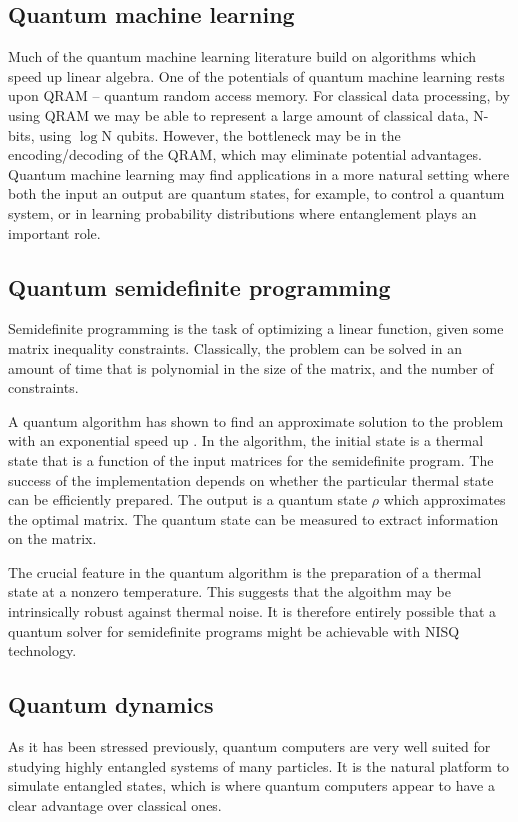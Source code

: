 \subsection{Quantum machine learning}
Much of the quantum machine learning literature build on algorithms which speed up linear algebra\cite{biamonte2017quantum}.
One of the potentials of quantum machine learning rests upon QRAM -- quantum random access memory. For classical data processing, by using QRAM we may be able to represent a large amount of classical data, N-bits, using $\log$N qubits. However, the bottleneck may be in the encoding/decoding of the QRAM, which may eliminate potential advantages. 
Quantum machine learning may find applications in a more natural setting where both the input an output are quantum states, for example, to control a quantum system, or in learning probability distributions where entanglement plays an important role.

\subsection{Quantum semidefinite programming}

Semidefinite programming is the task of optimizing a linear function, given some matrix inequality constraints. Classically, the problem can be solved in an amount of time that 
is polynomial in the size of the matrix, and the number of constraints.

A quantum algorithm has shown to find an approximate solution to the problem with an exponential speed up \cite{brandao2017quantum,brandao2017exponential}. In the algorithm, the initial state is a thermal state that is a function of the input matrices for the semidefinite program. The success of the implementation depends on whether the particular thermal state can be efficiently prepared. 
The output is a quantum state $\rho$ which approximates the optimal matrix. The quantum state can be measured to extract information on the matrix. 


The crucial feature in the quantum algorithm is the preparation of a thermal state at a nonzero temperature. This suggests that the algoithm may be intrinsically robust against thermal noise. It is therefore entirely possible that a quantum solver for semidefinite programs might be achievable with NISQ technology.


\subsection{Quantum dynamics}
As it has been stressed previously, quantum computers are very well suited for studying highly entangled systems of many particles. It is the natural platform to simulate entangled states, which is where quantum computers appear to have a clear advantage over classical ones.
 

